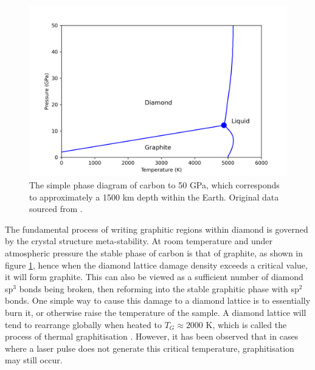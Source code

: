 \begin{refsection}
\clearpage

\begin{figure}
	\centering
	\includegraphics[width=\linewidth]{Chapter2/Figs/Raster/HDphase.png}
	\caption{The simple phase diagram of carbon to 50 \si{\giga\pascal}, which corresponds to approximately a 1500 \si{\kilo\metre} depth within the Earth. Original data sourced from \cite{blank:2018}.}
	\label{fig:phase}
\end{figure}

The fundamental process of writing graphitic regions within diamond is governed by the crystal structure meta-stability. At room temperature and under atmospheric pressure the stable phase of carbon is that of graphite, as shown in figure \ref{fig:phase}, hence when the diamond lattice damage density exceeds a critical value, it will form graphite. This can also be viewed as a sufficient number of diamond sp$^{3}$ bonds being broken, then reforming into the stable graphitic phase with sp$^{2}$ bonds. One simple way to cause this damage to a diamond lattice is to essentially burn it, or otherwise raise the temperature of the sample. A diamond lattice will tend to rearrange globally when heated to $T_{G} \approx 2000$ \si{\kelvin}, which is called the process of thermal graphitisation \cite{davies:1972}. However, it has been observed that in cases where a laser pulse does not generate this critical temperature, graphitisation may still occur. 


\end{refsection}

